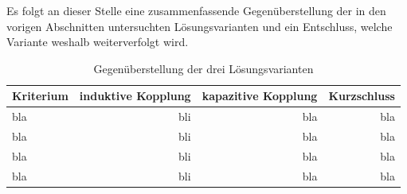 Es folgt an dieser Stelle eine zusammenfassende Gegen\"uberstellung der in den
vorigen Abschnitten untersuchten L\"osungsvarianten und ein Entschluss, welche
Variante weshalb weiterverfolgt wird.

\begin{table}[h!tb]
    \centering
    \caption{Gegen\"uberstellung der drei L\"osungsvarianten}
    \label{tab:simu:conclusion}
    \begin{tabular}{lrrr}
        \toprule
        Kriterium & induktive Kopplung & kapazitive Kopplung & Kurzschluss \\
        \midrule
        bla & bli & bla & bla\\
        bla & bli & bla & bla\\
        bla & bli & bla & bla\\
        bla & bli & bla & bla\\
        \bottomrule
    \end{tabular}
\end{table}
